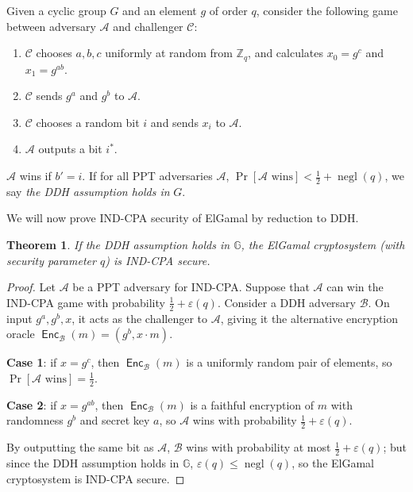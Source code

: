 \documentclass[12pt,a4paper]{article}
\DeclareMathOperator{\negl}{\text{negl}}
\DeclareMathOperator{\Enc}{\mathsf{Enc}}
\newtheorem{theorem}{Theorem}
\theoremstyle{definition}
\begin{document}
\begin{definition}
    Given a cyclic group $G$ and an element $g$ of order $q$, consider the following game between adversary $\mathcal{A}$ and challenger $\mathcal{C}$:
    \begin{enumerate}
        \item $\mathcal{C}$ chooses $a, b, c$ uniformly at random from $\mathbb{Z}_q$, and calculates $x_0=g^c$ and $x_1=g^{ab}$.
        \item $\mathcal{C}$ sends $g^a$ and $g^b$ to $\mathcal{A}$.
        \item $\mathcal{C}$ chooses a random bit $i$ and sends $x_i$ to $\mathcal{A}$.
        \item $\mathcal{A}$ outputs a bit $i^*$.
    \end{enumerate}
    $\mathcal{A}$ wins if $b' = i$. If for all PPT adversaries $\mathcal{A}$, $\Pr[\mathcal{A}\text{ wins}]<\frac{1}{2}+\negl(q)$, we say \textit{the DDH assumption holds in} $G$.
\end{definition}

We will now prove IND-CPA security of ElGamal by reduction to DDH.
\begin{theorem}
    If the DDH assumption holds in $\mathbb{G}$, the ElGamal cryptosystem (with security parameter $q$) is IND-CPA secure.
\end{theorem}
\begin{proof}
    Let $\mathcal{A}$ be a PPT adversary for IND-CPA. Suppose that $\mathcal{A}$ can win the IND-CPA game with probability $\frac{1}{2}+\varepsilon(q)$. Consider a DDH adversary $\mathcal{B}$. On input $g^a, g^b, x$, it acts as the challenger to $\mathcal{A}$, giving it the alternative encryption oracle $\Enc_{\mathcal{B}}(m)=(g^b, x\cdot m)$.
    
    \textbf{Case 1}: if $x=g^c$, then $\Enc_{\mathcal{B}}(m)$ is a uniformly random pair of elements, so $\Pr[\mathcal{A}\text{ wins}]=\frac{1}{2}$.
    
    \textbf{Case 2}: if $x=g^{ab}$, then $\Enc_{\mathcal{B}}(m)$ is a faithful encryption of $m$ with randomness $g^b$ and secret key $a$, so $\mathcal{A}$ wins with probability $\frac{1}{2}+\varepsilon(q)$.

    By outputting the same bit as $\mathcal{A}$, $\mathcal{B}$ wins with probability at most $\frac{1}{2}+\varepsilon(q)$; but since the DDH assumption holds in $\mathbb{G}$, $\varepsilon(q)\leq\negl(q)$, so the ElGamal cryptosystem is IND-CPA secure.
\end{proof}
\end{document}
